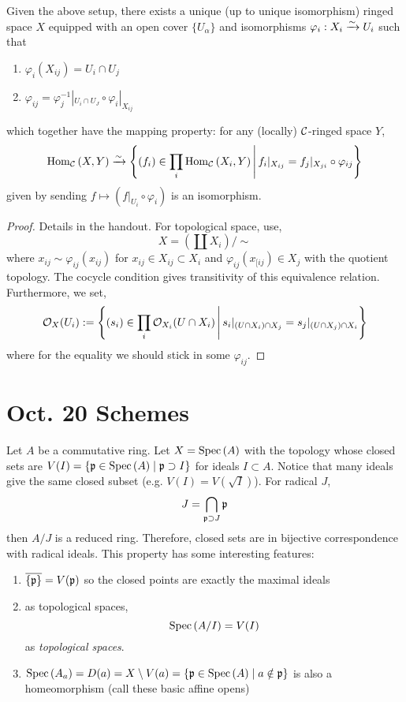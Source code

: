 \documentclass[12pt]{article}
\begin{document}
\begin{prop}
Given the above setup, there exists a unique (up to unique isomorphism) ringed space $X$ equipped with an open cover $\{ U_\alpha \}$ and isomorphisms $\varphi_i : X_i \xrightarrow{\sim} U_i$ such that 
\begin{enumerate}
\item $\varphi_i(X_{ij}) = U_i \cap U_j$
\item $\varphi_{ij} = \varphi_j^{-1} |_{U_i \cap U_J} \circ \varphi_i |_{X_{ij}}$
\end{enumerate}
which together have the mapping property: for any (locally) $\mathcal{C}$-ringed space $Y$,
\[ \mathrm{Hom}_{\mathcal{C}} \left( X, Y \right) \xrightarrow{\sim} \left\{ (f_i) \in \prod_i \mathrm{Hom}_{\mathcal{C}} \left( X_i, Y \right) \, \middle| \, f_i |_{X_{ij}} = f_j |_{X_{ji}} \circ \varphi_{ij} \right\} \]
given by sending $f \mapsto (f|_{U_i} \circ \varphi_i)$ is an isomorphism.
\end{prop}

\begin{proof}
Details in the handout. For topological space, use,
\[ X  = \left( \coprod X_i \right) / \sim \] 
where $x_{ij} \sim \varphi_{ij}(x_{ij})$ for $x_{ij} \in X_{ij} \subset X_i$ and $\varphi_{ij}(x_{[ij}) \in X_j$ with the quotient topology. The cocycle condition gives transitivity of this equivalence relation. Furthermore, we set,
\[ \mathcal{O}_{X}(U_i) := \left\{ (s_i) \in \prod_{i} \mathcal{O}_{X_i}(U \cap X_i) \, \middle| \, s_i |_{(U \cap X_i) \cap X_j} = s_j |_{(U \cap X_j) \cap X_i} \right\} \]
where for the equality we should stick in some $\varphi_{ij}$.
\end{proof}

\section{Oct. 20 Schemes}

Let $A$ be a commutative ring. Let $X = \mathrm{Spec}\left( A \right)$ with the topology whose closed sets are $V(I) = \{ \mathfrak{p} \in \mathrm{Spec}\left( A \right) \mid \mathfrak{p} \supset I \}$ for ideals $I \subset A$. Notice that many ideals give the same closed subset (e.g. $V(I) = V(\sqrt{I})$). For radical $J$,
\[ J = \bigcap_{\mathfrak{p} \supset J} \mathfrak{p} \]
then $A / J$ is a reduced ring. Therefore, closed sets are in bijective correspondence with radical ideals. This property has some interesting features:

\begin{enumerate}
\item $\overline{ \{ \mathfrak{p} \} } = V(\mathfrak{p})$
so the closed points are exactly the maximal ideals
\item as topological spaces,
\[ \mathrm{Spec}\left( A/I \right) = V(I) \]
as \textit{topological spaces}.
\item $\mathrm{Spec}\left( A_a \right) = D(a) = X \setminus V(a) = \{ \mathfrak{p} \in \mathrm{Spec}\left( A \right) \mid a \notin \mathfrak{p} \}$ is also a homeomorphism (call these basic affine opens)
\end{enumerate}
\end{document}

